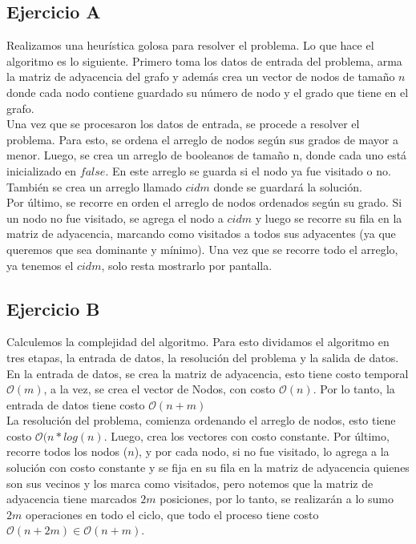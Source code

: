 
\subsection{Ejercicio A}
Realizamos una heurística golosa para resolver el problema. Lo que hace el algoritmo es lo siguiente. Primero toma los datos de entrada del problema, arma la matriz de adyacencia del grafo y además crea un vector de nodos de tamaño $n$ donde cada nodo contiene guardado su número de nodo y el grado que tiene en el grafo. \\ 
Una vez que se procesaron los datos de entrada, se procede a resolver el problema. Para esto, se ordena el arreglo de nodos según sus grados de mayor a menor. Luego, se crea un arreglo de booleanos de tamaño n, donde cada uno está inicializado en $false$. En este arreglo se guarda si el nodo ya fue visitado o no. También se crea un arreglo llamado $cidm$ donde se guardará la solución. \\ 
Por último, se recorre en orden el arreglo de nodos ordenados según su grado. Si un nodo no fue visitado, se agrega el nodo a $cidm$ y luego se recorre su fila en la matriz de adyacencia, marcando como visitados a todos sus adyacentes (ya que queremos que sea dominante y mínimo).
Una vez que se recorre todo el arreglo, ya tenemos el $cidm$, solo resta mostrarlo por pantalla.


\subsection{Ejercicio B}
Calculemos la complejidad del algoritmo. Para esto dividamos el algoritmo en tres etapas, la entrada de datos, la resolución del problema y la salida de datos. \\ 

En la entrada de datos, se crea la matriz de adyacencia, esto tiene costo temporal $\mathcal{O}(m)$, a la vez, se crea el vector de Nodos, con costo $\mathcal{O}(n)$. Por lo tanto, la entrada de datos tiene costo $\mathcal{O}(n + m)$ \\ 

La resolución del problema, comienza ordenando el arreglo de nodos, esto tiene costo  $\mathcal{O}(n*log(n)$. Luego, crea los vectores con costo constante. Por último, recorre todos los nodos ($n$), y por cada nodo, si no fue visitado, lo agrega a la solución con costo constante y se fija en su fila en la matriz de adyacencia quienes son sus vecinos y los marca como visitados, pero notemos que la matriz de adyacencia tiene marcados $2m$ posiciones, por lo tanto, se realizarán a lo sumo $2m$ operaciones en todo el ciclo, que todo el proceso tiene costo $\mathcal{O}(n + 2m) \in \mathcal{O}(n + m)$. \\ 

